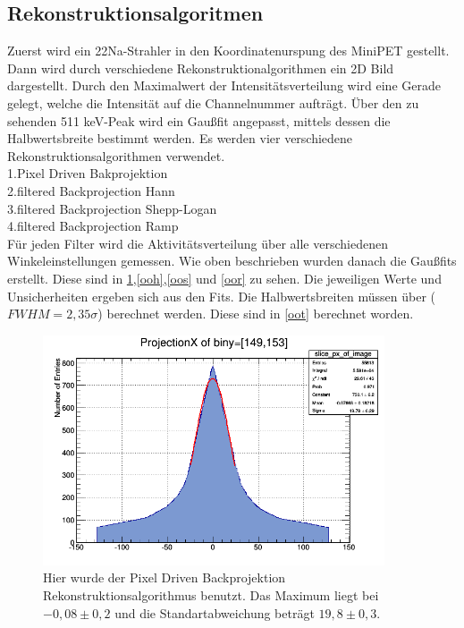 \subsection{Rekonstruktionsalgoritmen}
Zuerst wird ein 22Na-Strahler in den Koordinatenurspung des MiniPET gestellt. Dann wird durch verschiedene Rekonstruktionalgorithmen ein 2D Bild dargestellt. Durch den Maximalwert der Intensitätsverteilung wird eine Gerade gelegt, welche die Intensität auf die Channelnummer aufträgt. Über den zu sehenden 511 keV-Peak wird ein Gaußfit angepasst, mittels dessen die Halbwertsbreite bestimmt werden.
Es werden vier verschiedene Rekonstruktionsalgorithmen verwendet. \\
1.Pixel Driven Bakprojektion \\
2.filtered Backprojection Hann \\
3.filtered Backprojection Shepp-Logan \\ 
4.filtered Backprojection Ramp \\
Für jeden Filter wird die Aktivitätsverteilung über alle verschiedenen Winkeleinstellungen gemessen. Wie oben beschrieben wurden danach die Gaußfits erstellt.
Diese sind in \cref{ooo},\cref{ooh},\cref{oos} und \cref{oor} zu sehen. Die jeweiligen Werte und Unsicherheiten ergeben sich aus den Fits. Die Halbwertsbreiten müssen über ($FWHM = 2,35\sigma$) berechnet werden. Diese sind in \cref{oot} berechnet worden.
\begin{figure}[h!]
	\centering
	\includegraphics[width=0.9\textwidth]{Ohne-Filter.png}
	\caption{Hier wurde der Pixel Driven Backprojektion Rekonstruktionsalgorithmus benutzt. Das Maximum liegt bei $-0,08 \pm 0,2$ und die Standartabweichung beträgt $19,8 \pm 0,3$.}
	\label{ooo}
\end{figure}
